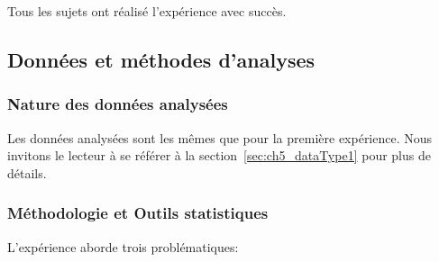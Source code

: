 Tous les sujets ont réalisé l'expérience avec succès.

\subsection{Données et méthodes d'analyses}

\subsubsection{Nature des données analysées}

Les données analysées sont les mêmes que pour la première expérience. Nous invitons le lecteur à se référer à la section~\ref{sec:ch5_dataType1} pour plus de détails.
 
\subsubsection{Méthodologie et Outils statistiques}
\label{sec:ch5_methodoEtStat2}

L'expérience aborde trois problématiques:


